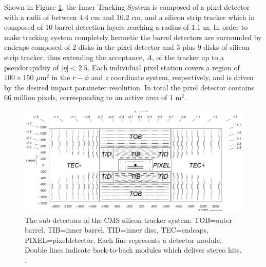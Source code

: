 Shown in Figure \ref{fig-Tracker}, the Inner Tracking System is composed of a pixel detector with a radii of between 4.4 cm and 10.2 cm, and a silicon strip tracker which in composed of 10 barrel detection layers reaching a radius of 1.1 m. In order to make tracking system completely hermetic the barrel detectors are surrounded by endcaps composed of 2 disks in the pixel detector and 3 plus 9 disks of silicon strip tracker, thus extending the acceptance, $A$, of the tracker up to a pseudorapidity of $|\eta| < 2.5$.  Each individual pixel station covers a region of $100\times150$ $\mu$m$^2$ in the $r-\phi$ and $z$ coordinate system, respectively, and is driven by the desired impact parameter resolution. In total the pixel detector contains 66 million pixels, corresponding to an active area of 1 m$^2$.

\begin{figure} [h!] 
\includegraphics[width=\textwidth]{Figures/Tracker.png}
\caption{The sub-detectors of the CMS silicon tracker system: TOB=outer barrel, TIB=inner barrel, TID=inner disc, TEC=endcaps, PIXEL=pixeldetector. Each line represents a detector module. Double lines indicate back-to-back modules which deliver stereo hits. \cite{CMSexperiment}.}
\label{fig-Tracker}
\end{figure}

